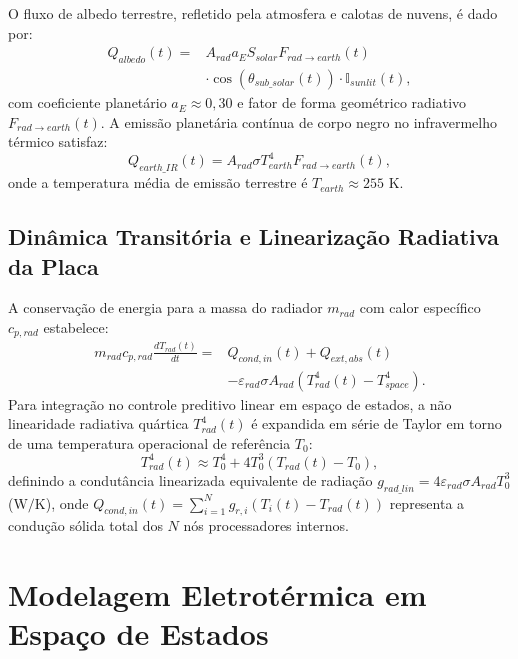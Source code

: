 \documentclass[journal]{IEEEtran}
\begin{document}
O fluxo de albedo terrestre, refletido pela atmosfera e calotas de nuvens, é dado por:
\begin{equation}
\begin{split}
Q_{albedo}(t) = & A_{rad} a_E S_{solar} F_{rad \to earth}(t) \\
& \cdot \cos(\theta_{sub\_solar}(t)) \cdot \mathbb{I}_{sunlit}(t),
\end{split}
\end{equation}
com coeficiente planetário $a_E \approx 0{,}30$ e fator de forma geométrico radiativo $F_{rad \to earth}(t)$. A emissão planetária contínua de corpo negro no infravermelho térmico satisfaz:
\begin{equation}
Q_{earth\_IR}(t) = A_{rad} \sigma T_{earth}^4 F_{rad \to earth}(t),
\end{equation}
onde a temperatura média de emissão terrestre é $T_{earth} \approx 255\text{ K}$.

\subsection{Dinâmica Transitória e Linearização Radiativa da Placa}
A conservação de energia para a massa do radiador $m_{rad}$ com calor específico $c_{p, rad}$ estabelece:
\begin{equation}
\begin{split}
m_{rad} c_{p, rad} \frac{d T_{rad}(t)}{dt} = & Q_{cond, in}(t) + Q_{ext,abs}(t) \\
& - \varepsilon_{rad} \sigma A_{rad} \left( T_{rad}^4(t) - T_{space}^4 \right).
\end{split}
\end{equation}
Para integração no controle preditivo linear em espaço de estados, a não linearidade radiativa quártica $T_{rad}^4(t)$ é expandida em série de Taylor em torno de uma temperatura operacional de referência $T_0$:
\begin{equation}
T_{rad}^4(t) \approx T_0^4 + 4 T_0^3 (T_{rad}(t) - T_0),
\end{equation}
definindo a condutância linearizada equivalente de radiação $g_{rad\_lin} = 4 \varepsilon_{rad} \sigma A_{rad} T_0^3$ ($\text{W/K}$), onde $Q_{cond, in}(t) = \sum_{i=1}^N g_{r, i} (T_i(t) - T_{rad}(t))$ representa a condução sólida total dos $N$ nós processadores internos.

\section{Modelagem Eletrotérmica em Espaço de Estados}
\end{document}
